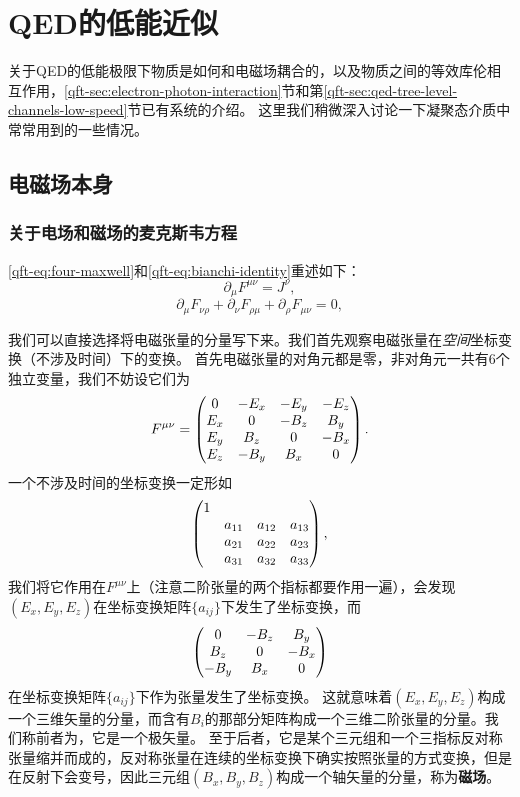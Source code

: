 \chapter{QED的低能近似}

关于QED的低能极限下物质是如何和电磁场耦合的，以及物质之间的等效库伦相互作用，\ref{qft-sec:electron-photon-interaction}节和第\ref{qft-sec:qed-tree-level-channels-low-speed}节已有系统的介绍。
这里我们稍微深入讨论一下凝聚态介质中常常用到的一些情况。

\section{电磁场本身}

\subsection{关于电场和磁场的麦克斯韦方程}

\eqref{qft-eq:four-maxwell}和\eqref{qft-eq:bianchi-identity}重述如下：
\begin{equation}
    \partial_\mu F^{\mu \nu} = J^\nu,
    \label{eq:four-maxwell}
\end{equation}
\begin{equation}
    \partial_\mu F_{\nu \rho} + \partial_\nu F_{\rho \mu} + \partial_\rho F_{\mu \nu} = 0,
    \label{eq:bianchi-identity}
\end{equation}

我们可以直接选择将电磁张量的分量写下来。我们首先观察电磁张量在\emph{空间}坐标变换（不涉及时间）下的变换。
首先电磁张量的对角元都是零，非对角元一共有$6$个独立变量，我们不妨设它们为
\[
    F^{\mu \nu} = \pmqty{
        0 & -E_x & -E_y & -E_z \\
        E_x & 0 & -B_z & B_y \\
        E_y & B_z & 0 & -B_x \\
        E_z & -B_y & B_x & 0
    }.
\]
一个不涉及时间的坐标变换一定形如
\[
    \pmqty{\dmat{1, \xmat*{a}{3}{3} }},
\]
我们将它作用在$F^{\mu \nu}$上（注意二阶张量的两个指标都要作用一遍），会发现$(E_x, E_y, E_z)$在坐标变换矩阵$\{a_{ij}\}$下发生了坐标变换，而
\[
    \pmqty{
        0 & -B_z & B_y \\
        B_z & 0 & -B_x \\
        -B_y & B_x & 0
    }
\]
在坐标变换矩阵$\{a_{ij}\}$下作为张量发生了坐标变换。
这就意味着$(E_x, E_y, E_z)$构成一个三维矢量的分量，而含有$B_i$的那部分矩阵构成一个三维二阶张量的分量。我们称前者为，它是一个极矢量。
至于后者，它是某个三元组和一个三指标反对称张量缩并而成的，反对称张量在连续的坐标变换下确实按照张量的方式变换，但是在反射下会变号，因此三元组$(B_x, B_y, B_z)$构成一个轴矢量的分量，称为\textbf{磁场}。

